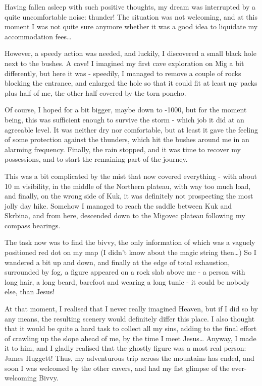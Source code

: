 Having fallen asleep with such positive thoughts, my dream was
interrupted by a quite uncomfortable noise: thunder! The situation was
not welcoming, and at this moment I was not quite sure anymore whether
it was a good idea to liquidate my accommodation fees\ldots{}

However, a speedy action was needed, and luckily, I discovered a small
black hole next to the bushes. A cave! I imagined my first cave
exploration on Mig a bit differently, but here it was - speedily, I
managed to remove a couple of rocks blocking the entrance, and enlarged
the hole so that it could fit at least my packs plus half of me, the
other half covered by the torn poncho.

Of course, I hoped for a bit bigger, maybe down to -1000, but for the
moment being, this was sufficient enough to survive the storm - which
job it did at an agreeable level. It was neither dry nor comfortable,
but at least it gave the feeling of some protection against the
thunders, which hit the bushes around me in an alarming frequency.
Finally, the rain stopped, and it was time to recover my possessions,
and to start the remaining part of the journey.

This was a bit complicated by the mist that now covered everything -
with about 10 m visibility, in the middle of the Northern plateau, with
way too much load, and finally, on the wrong side of Kuk, it was
definitely not prospecting the most jolly day hike. Somehow I managed to
reach the saddle between Kuk and Skrbina, and from here, descended down
to the Migovec plateau following my compass bearings.

The task now was to find the bivvy, the only information of which was a
vaguely positioned red dot on my map (I didn't know about the magic
string then\ldots{}) So I wandered a bit up and down, and finally at the
edge of total exhaustion, surrounded by fog, a figure appeared on a rock
slab above me - a person with long hair, a long beard, barefoot and
wearing a long tunic - it could be nobody else, than Jesus!

At that moment, I realised that I never really imagined Heaven, but if I
did so by any means, the resulting scenery would definitely differ this
place. I also thought that it would be quite a hard task to collect all
my sins, adding to the final effort of crawling up the slope ahead of
me, by the time I meet Jesus\ldots{} Anyway, I made it to him, and I
gladly realised that the ghostly figure was a most real person: James
Huggett! Thus, my adventurous trip across the mountains has ended, and
soon I was welcomed by the other cavers, and had my fist glimpse of the
ever-welcoming Bivvy.

